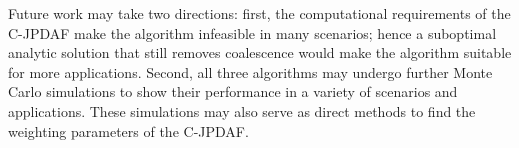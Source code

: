 \documentclass[letterpaper, 10pt, conference]{ieeeconf}
\begin{document}
%

Future work may take two directions: first, the computational requirements of the C-JPDAF make the algorithm infeasible in many scenarios; hence a suboptimal analytic solution that still removes coalescence would make the algorithm suitable for more applications. Second, all three algorithms may undergo further Monte Carlo simulations to show their performance in a variety of scenarios and applications.
These simulations may also serve as direct methods to find the weighting parameters of the C-JPDAF.

\end{document}
